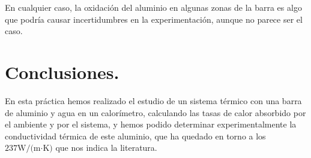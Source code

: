 \documentclass[a4paper,12pt,spanish]{article}
\begin{document}
	En cualquier caso, la oxidación del aluminio en algunas zonas de la barra es algo que podría causar incertidumbres en la experimentación, aunque no parece ser el caso.
	
	
	\section{Conclusiones.}
	
	\iffalse
	Se incluirá una breve sección de conclusiones donde se expongan las principales conclusiones del estudio.
	
	'' En conclusión hemos visto tal propiedad y comprobado experimentalmente la relación entre tal y cual cosa.''
	
	
	
	\begin{enumerate}
		\item Determinar la capacidad calorífica de un calorímetro a partir de calorimetría de intercambio de calor.
		\item Establecer equilibrios térmicos en calorimetría.
		\item Determinar experimentalmente la conductividad térmica.
	\end{enumerate}
	\fi	
	
	
	En esta práctica hemos realizado el estudio de un sistema térmico con una barra de aluminio y agua en un calorímetro, calculando las tasas de calor absorbido por el ambiente y por el sistema, y hemos podido determinar experimentalmente la conductividad térmica de este aluminio, que ha quedado en torno a los  $237 \text{W/(m·K)}$ que nos indica la literatura.
	
	
	\iffalse
	
	\begin{thebibliography}{3}
		
		
		
		
		\bibitem{UNED2022} (varios) Guiones de prácticas- Técnicas Experimentales II. Grado en Física. Versión 2.1  UNED, 2022 \url{https://2022.cursosvirtuales.uned.es/o/3754218}
		
		
		\bibitem{UNED2021} (varios) Técnicas Experimentales I. Versión 3.5.  UNED, 2021 \url{https://2021.cursosvirtuales.uned.es/o/42035617}
		
		
		
	\end{thebibliography}
	\fi
	
	
	
	
	
\end{document}
